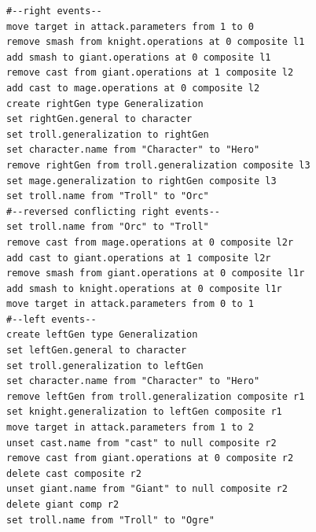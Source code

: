 \vspace{-20pt}
\begin{lstlisting}[firstnumber=1,style=eol,caption={Merged change events (operations) of the models in Fig. \ref{fig:class_diagram_rpg} and Listings \ref{lst:cbp_right} and \ref{lst:cbp_left} using Epsilon CBP. The commented lines are added only to improve readability.},label=lst:cbp_merged_ecbp]
#--right events--
move target in attack.parameters from 1 to 0
remove smash from knight.operations at 0 composite l1
add smash to giant.operations at 0 composite l1
remove cast from giant.operations at 1 composite l2
add cast to mage.operations at 0 composite l2
create rightGen type Generalization
set rightGen.general to character
set troll.generalization to rightGen
set character.name from "Character" to "Hero"
remove rightGen from troll.generalization composite l3
set mage.generalization to rightGen composite l3
set troll.name from "Troll" to "Orc"
#--reversed conflicting right events--
set troll.name from "Orc" to "Troll"
remove cast from mage.operations at 0 composite l2r
add cast to giant.operations at 1 composite l2r
remove smash from giant.operations at 0 composite l1r
add smash to knight.operations at 0 composite l1r
move target in attack.parameters from 0 to 1
#--left events--
create leftGen type Generalization
set leftGen.general to character
set troll.generalization to leftGen
set character.name from "Character" to "Hero"
remove leftGen from troll.generalization composite r1
set knight.generalization to leftGen composite r1
move target in attack.parameters from 1 to 2
unset cast.name from "cast" to null composite r2
remove cast from giant.operations at 0 composite r2
delete cast composite r2
unset giant.name from "Giant" to null composite r2
delete giant comp r2
set troll.name from "Troll" to "Ogre"
\end{lstlisting}

